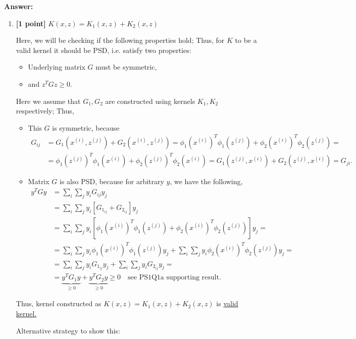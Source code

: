 \documentclass{article}
\begin{document}
\textbf{Answer:}

\begin{enumerate}[label=\alph*)]
    \item \textbf{[1 point]} $K(x, z) = K_1(x, z) + K_2(x, z)$

    Here, we will be checking if the following properties hold; Thus, for $K$ to be a valid kernel it should be PSD, i.e. satisfy two properties:
\begin{itemize}
    \item Underlying matrix $G$ must be symmetric,
    \item and $z^TGz\geq 0$. 
\end{itemize}
Here we assume that $G_1, G_2$ are constructed using kernels $K_1, K_2$ respectively; Thus, 

\begin{itemize}
    \item This $G$ is symmetric, because \begin{align*}
   \boxed{G_{ij}} & = G_1(x^{(i)}, z^{(j)}) + G_2(x^{(i)}, z^{(j)}) = \phi_1(x^{(i)})^T\phi_1(z^{(j)}) + \phi_2(x^{(i)})^T\phi_2(z^{(j)})=\\[8pt]
    & = \phi_1(z^{(j)})^T\phi_1(x^{(i)}) + \phi_2(z^{(j)})^T\phi_2(x^{(i)}) = G_1( z^{(j)}, x^{(i)}) + G_2( z^{(j)}, x^{(i)}) = \boxed{G_{ji}}.
\end{align*}

\item Matrix $G$ is also PSD, because for arbitrary $y$, we have the following,
\begin{align*}
y^TGy &= \sum_{i}\sum_{j} y_iG_{ij}y_j \\
& = \sum_{i}\sum_{j} y_i\left[G_{1_{ij}} + G_{2_{ij}} \right]y_j\\
&=\sum_{i}\sum_{j} y_i\left[ \phi_1(x^{(i)})^T\phi_1(z^{(j)}) + \phi_2(x^{(i)})^T\phi_2(z^{(j)}) \right]y_j=\\
& = \sum_{i}\sum_{j} y_i\phi_1(x^{(i)})^T\phi_1(z^{(j)})y_j +  \sum_{i}\sum_{j} y_i\phi_2(x^{(i)})^T\phi_2(z^{(j)})y_j =\\
&= \sum_{i}\sum_{j} y_iG_{1_{ij}}y_j +  \sum_{i}\sum_{j} y_iG_{2_{ij}}y_j = \\
& = \underbrace{y^TG_1y}_{\geq 0} + \underbrace{y^TG_2y}_{\geq 0} \geq 0 \quad\mbox{see PS1Q1a supporting result.}
\end{align*}
\end{itemize}
Thus, kernel constructed as $K(x, z) = K_1(x, z) + K_2(x, z)$ is \underline{valid kernel. }

Alternative strategy to show this:


\end{enumerate}
\end{document}
